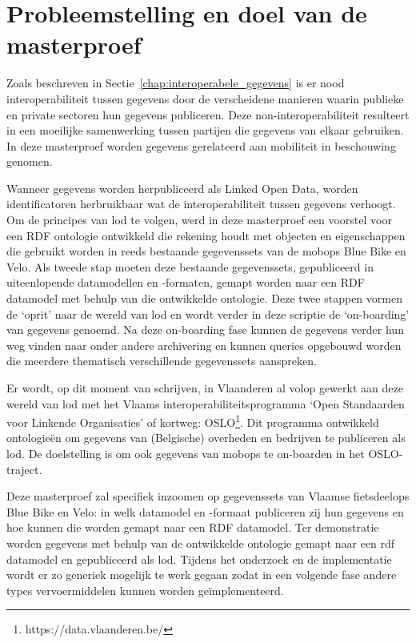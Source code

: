 \section{Probleemstelling en doel van de masterproef}
\label{sec:problem}
Zoals beschreven in Sectie~\ref{chap:interoperabele_gegevens} is er nood interoperabiliteit tussen gegevens door de verscheidene manieren waarin publieke en private sectoren hun gegevens publiceren. Deze non-interoperabiliteit resulteert in een moeilijke samenwerking tussen partijen die gegevens van elkaar gebruiken. In deze masterproef worden gegevens gerelateerd aan mobiliteit in beschouwing genomen.

Wanneer gegevens worden herpubliceerd als Linked Open Data, worden identificatoren herbruikbaar wat de interoperabiliteit tussen gegevens verhoogt. Om de principes van \acrshort{lod} te volgen, werd in deze masterproef een voorstel voor een RDF ontologie ontwikkeld die rekening houdt met objecten en eigenschappen die gebruikt worden in reeds bestaande gegevenssets van de \glspl{mobop} Blue Bike en Velo. Als tweede stap moeten deze bestaande gegevenssets, gepubliceerd in uiteenlopende datamodellen en -formaten, gemapt worden naar een RDF datamodel met behulp van die ontwikkelde ontologie.
Deze twee stappen vormen de `oprit' naar de wereld van \acrshort{lod} en wordt verder in deze scriptie de `on-boarding' van gegevens genoemd. Na deze on-boarding fase kunnen de gegevens verder hun weg vinden naar onder andere archivering en kunnen 
queries opgebouwd worden die meerdere thematisch verschillende gegevenssets aanspreken.

Er wordt, op dit moment van schrijven, in Vlaanderen al volop gewerkt aan deze wereld van \acrshort{lod} met het Vlaams interoperabiliteitsprogramma `Open Standaarden voor Linkende Organisaties' of kortweg: OSLO\footnote{https://data.vlaanderen.be/}. Dit programma ontwikkeld ontologieën om gegevens van (Belgische) overheden en bedrijven te publiceren als \acrshort{lod}. De doelstelling is om ook gegevens van \glspl{mobop} te on-boarden in het OSLO-traject.

Deze masterproef zal specifiek inzoomen op gegevenssets van Vlaamse \glspl{fietsdeelop} Blue Bike en Velo: in welk datamodel en -formaat publiceren zij hun gegevens en hoe kunnen die worden gemapt naar een RDF datamodel. Ter demonstratie worden gegevens met behulp van de ontwikkelde ontologie gemapt naar een \acrshort{rdf} datamodel en gepubliceerd als \acrlong{lod}. Tijdens het onderzoek en de implementatie wordt er zo generiek mogelijk te werk gegaan zodat in een volgende fase andere types vervoermiddelen kunnen worden geïmplementeerd.

